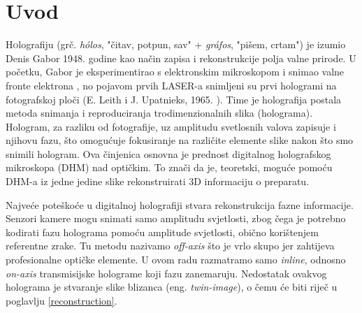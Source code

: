 \documentclass[hidelinks]{ferseminar}
\begin{document}
\umetninaslov

\section{Uvod}
\lettrine[nindent=0em,lines=2]{H}olografiju (grč. \textit{hólos}, "čitav, potpun, sav" + \textit{gráfos}, "pišem, crtam") je izumio Denis Gabor 1948. godine kao način zapisa i rekonstrukcije polja valne prirode. U početku, Gabor je eksperimentirao s elektronskim mikroskopom i snimao valne fronte elektrona \cite{gabor1948new}, no pojavom prvih LASER-a snimljeni su prvi hologrami na fotografskoj ploči (E. Leith i J. Upatnieks, 1965. \cite{leith1965microscopy}). Time je holografija postala metoda snimanja i reproduciranja trodimenzionalnih slika (holograma). Hologram, za razliku od fotografije, uz amplitudu svetlosnih valova zapisuje i njihovu fazu, što omogućuje fokusiranje na različite elemente slike nakon što smo snimili hologram. Ova činjenica osnovna je prednost digitalnog holografskog mikroskopa (DHM) nad optičkim. To znači da je, teoretski, moguće pomoću DHM-a iz jedne jedine slike rekonstruirati 3D informaciju o preparatu.

Najveće poteškoće u digitalnoj holografiji stvara rekonstrukcija fazne informacije. Senzori kamere mogu snimati samo amplitudu svjetlosti, zbog čega je potrebno kodirati fazu holograma pomoću amplitude svjetlosti, obično korištenjem referentne zrake. Tu metodu nazivamo \textit{off-axis} što je vrlo skupo jer zahtijeva profesionalne optičke elemente. U ovom radu razmatramo samo \textit{inline}, odnosno \textit{on-axis} transmisijske holograme koji fazu zanemaruju. Nedostatak ovakvog holograma je stvaranje slike blizanca (eng. \emph{twin-image}), o čemu će biti riječ u poglavlju \ref{reconstruction}.
\end{document}
